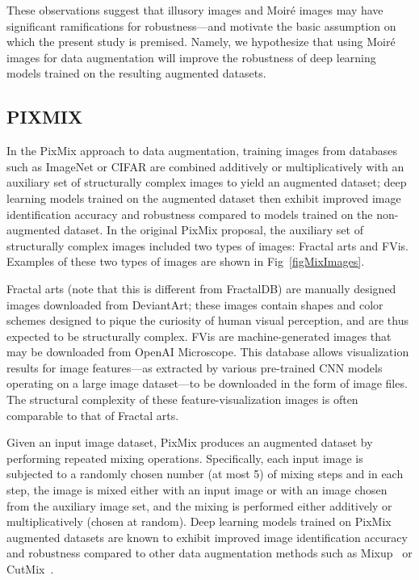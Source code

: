 These observations suggest that illusory images and Moir\'e images
may have significant ramifications for robustness---and motivate the
basic assumption on which the present study is premised. Namely, we hypothesize
that using Moir\'e images for data augmentation will improve the 
robustness of deep learning models trained on the resulting
augmented datasets.

\subsection{PIXMIX}
\label{sec:PIXMIX}

In the PixMix approach to data augmentation,
training images from databases such as ImageNet or CIFAR
are combined additively or multiplicatively with an auxiliary set
of structurally complex images to yield an augmented dataset;
deep learning models trained on the augmented dataset then
exhibit improved image identification accuracy and robustness
compared to models trained on the non-augmented dataset.
In the original PixMix proposal, the auxiliary set of 
structurally complex images included two types of images:
Fractal arts and FVis. Examples of these two
types of images are shown in Fig~\ref{figMixImages}.

Fractal arts (note that this is different from FractalDB) are manually designed images downloaded
from DeviantArt; these images contain
shapes and color schemes designed to pique the curiosity
of human visual perception, and are thus expected to be
structurally complex.
FVis are machine-generated images that may be downloaded
from OpenAI Microscope. This database allows
visualization results for image features---as extracted
by various pre-trained CNN models operating on a large image
dataset---to be downloaded in the form of image files.
The structural complexity of these feature-visualization images
is often comparable to that of Fractal arts.

Given an input image dataset, PixMix produces an
augmented dataset by performing repeated mixing operations.
Specifically, each input image is subjected to
a randomly chosen number (at most 5) of mixing steps and 
in each step, the image is mixed either with an input
image or with an image chosen from the auxiliary image
set, and the mixing is performed either additively or
multiplicatively (chosen at random).
Deep learning models trained on PixMix augmented datasets
are known to exhibit improved image identification accuracy 
and robustness compared to other data augmentation methods
such as Mixup~\cite{Mixup} or CutMix~\cite{CutMix}.

